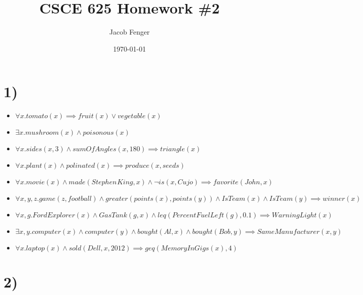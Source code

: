 \documentclass[22pt]{article}
\begin{document}
\title{CSCE 625 Homework \#2}
\author{Jacob Fenger}
\date{\today}
\maketitle

\section*{1)}

\begin{itemize}
	\item $ \forall x. tomato(x) \implies fruit(x) \lor vegetable(x) $
	\item $ \exists x. mushroom(x) \land poisonous(x) $
	\item $ \forall x. sides(x, 3) \land sumOfAngles(x, 180) \implies triangle(x) $
	\item $ \forall x. plant(x) \land polinated(x) \implies produce(x, seeds) $
	\item $ \forall x. movie(x) \land made(Stephen_{}King, x) \land \neg is(x, Cujo) 
		\implies favorite(John, x) $
	\item $ \forall x, y, z. game(z, football) \land greater(points(x), points(y)) \land
		IsTeam(x) \land IsTeam(y) \implies winner(x) $ 
	\item $ \forall x, g. FordExplorer(x) \land GasTank(g, x) \land leq(PercentFuelLeft(g), 0.1) 
		\implies WarningLight(x) $
	\item $ \exists x, y. computer(x) \land computer(y) \land bought(Al, x) \land 
		bought(Bob, y) \implies SameManufacturer(x, y) $
	\item $ \forall x. laptop(x) \land sold(Dell, x, 2012) \implies geq(MemoryInGigs(x), 4) $
\end{itemize}

\section*{2)}
\end{document}
